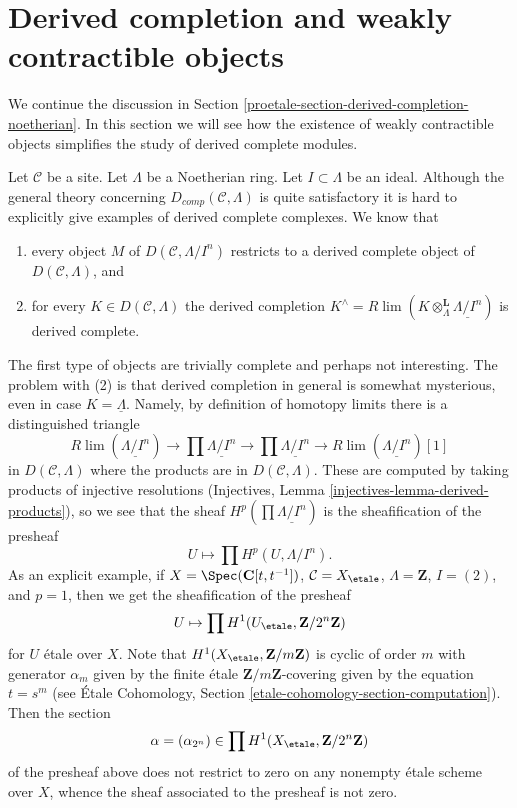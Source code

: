 \section{Derived completion and weakly contractible objects}
\label{proetale-section-derived-completion-proetale}
We continue the discussion in
Section \ref{proetale-section-derived-completion-noetherian}.
In this section we will see how the existence of
weakly contractible objects simplifies the study
of derived complete modules.

\medskip\noindent
Let $\mathcal{C}$ be a site. Let $\Lambda$ be a Noetherian ring.
Let $I \subset \Lambda$ be an ideal. Although the general theory
concerning $D_{comp}(\mathcal{C}, \Lambda)$ is quite satisfactory
it is hard to explicitly give examples of derived complete complexes.
We know that
\begin{enumerate}
\item every object $M$ of $D(\mathcal{C}, \Lambda/I^n)$ restricts to a
derived complete object of $D(\mathcal{C}, \Lambda)$, and
\item for every $K \in D(\mathcal{C}, \Lambda)$ the derived completion
$K^\wedge = R\lim (K \otimes_\Lambda^\mathbf{L} \underline{\Lambda/I^n})$
is derived complete.
\end{enumerate}
The first type of objects are trivially complete and perhaps not
interesting. The problem with (2) is that derived completion
in general is somewhat mysterious, even in case $K = \underline{\Lambda}$.
Namely, by definition of homotopy limits there
is a distinguished triangle
$$
R\lim(\underline{\Lambda/I^n}) \to
\prod \underline{\Lambda/I^n} \to
\prod \underline{\Lambda/I^n} \to
R\lim(\underline{\Lambda/I^n})[1]
$$
in $D(\mathcal{C}, \Lambda)$ where the products are in
$D(\mathcal{C}, \Lambda)$. These are computed by taking products
of injective resolutions
(Injectives, Lemma \ref{injectives-lemma-derived-products}),
so we see that the sheaf $H^p(\prod \underline{\Lambda/I^n})$
is the sheafification of the presheaf
$$
U \longmapsto \prod H^p(U, \Lambda/I^n).
$$
As an explicit example, if $X = \Spec(\mathbf{C}[t, t^{-1}])$,
$\mathcal{C} = X_\etale$, $\Lambda = \mathbf{Z}$, $I = (2)$, and
$p = 1$, then we get the sheafification of the presheaf
$$
U \mapsto \prod H^1(U_\etale, \mathbf{Z}/2^n\mathbf{Z})
$$
for $U$ \'etale over $X$. Note that $H^1(X_\etale, \mathbf{Z}/m\mathbf{Z})$
is cyclic of order $m$ with generator $\alpha_m$ given by the finite \'etale
$\mathbf{Z}/m\mathbf{Z}$-covering given by the equation $t = s^m$
(see \'Etale Cohomology, Section \ref{etale-cohomology-section-computation}).
Then the section
$$
\alpha = (\alpha_{2^n}) \in \prod H^1(X_\etale, \mathbf{Z}/2^n\mathbf{Z})
$$
of the presheaf above does not restrict to zero on any nonempty \'etale
scheme over $X$, whence the sheaf associated to the presheaf is not zero.

